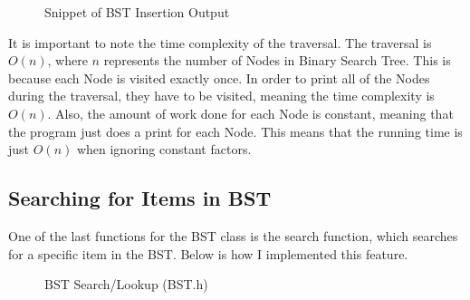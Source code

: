 \documentclass[letterpaper, 10pt]{article}
\begin{document}
\begin{figure}[H] 
    \centering 
    \caption{Snippet of BST Insertion Output}
    \label{fig:figure3.9}
\end{figure}

\noindent
It is important to note the time complexity of the traversal. The traversal is $O(n)$, where $n$ represents the number of Nodes in Binary Search Tree. This is because each Node is visited exactly once. In order to print all of the Nodes during the traversal, they have to be visited, meaning the time complexity is $O(n)$. Also, the amount of work done for each Node is constant, meaning that the program just does a print for each Node. This means that the running time is just $O(n)$ when ignoring constant factors.

\subsection{Searching for Items in BST}
\noindent
One of the last functions for the BST class is the search function, which searches for a specific item in the BST. Below is how I implemented this feature.

\begin{figure}[H]
  \centering
   
  \label{fig:figure3.10-part1}
\end{figure}

\begin{figure}[H]
  \centering
   
  \caption{BST Search/Lookup (BST.h)}
  \label{fig:figure3.10-part2}
\end{figure}
\end{document}
